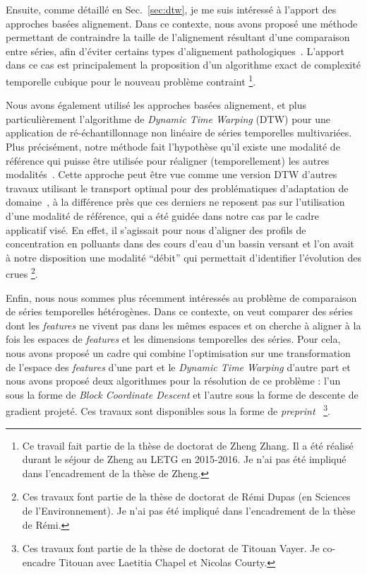 \haveabreak{}

Ensuite, comme détaillé en Sec.~\ref{sec:dtw}, je me suis intéressé à l'apport
des approches basées alignement.
Dans ce contexte, nous avons proposé une méthode
permettant de contraindre la taille de l'alignement résultant d'une comparaison
entre séries, afin d'éviter certains types d'alignement
pathologiques~\cite{zhang2017dynamic}.
L'apport dans ce cas est principalement la proposition d'un algorithme exact de
complexité temporelle cubique pour le nouveau problème contraint%
\footnote{Ce travail fait partie de la thèse de doctorat de Zheng Zhang.
Il a été réalisé
durant le séjour de Zheng au LETG en 2015-2016. Je n'ai pas été impliqué dans
l'encadrement de la thèse de Zheng.}.

Nous avons également utilisé les approches basées alignement, et plus
particulièrement l'algorithme de \emph{Dynamic Time Warping} (DTW)
pour une application de ré-échantillonnage non linéaire de séries temporelles
multivariées.
Plus précisément, notre méthode fait l'hypothèse qu'il existe une modalité de
référence qui puisse être utilisée pour réaligner (temporellement)
les autres modalités~\cite{dupas:halshs-01228397}.
Cette approche peut être vue comme une version DTW d'autres travaux utilisant
le transport optimal pour des problématiques d'adaptation de
domaine~\cite{courty:hal-02112785}, à la différence près que ces derniers ne
reposent pas sur l'utilisation d'une modalité de référence, qui a été guidée
dans notre cas par le cadre applicatif visé.
En effet, il s'agissait pour nous d'aligner des profils de concentration en
polluants dans des cours d'eau d'un bassin versant et l'on avait à notre
disposition une modalité ``débit'' qui permettait d'identifier l'évolution des
crues%
\footnote{Ces travaux font partie de la thèse de doctorat de Rémi Dupas
(en Sciences de
l'Environnement). Je n'ai pas été impliqué dans l'encadrement de la thèse de
Rémi.}.

Enfin, nous nous sommes plus récemment intéressés au problème de comparaison
de séries temporelles hétérogènes.
Dans ce contexte, on veut comparer des séries dont les \emph{features}
ne vivent pas dans les mêmes espaces et on cherche à aligner à la fois les
espaces de \emph{features} et les dimensions temporelles des séries.
Pour cela, nous avons proposé un cadre qui combine l'optimisation sur une
transformation de l'espace des \emph{features} d'une part et le
\emph{Dynamic Time Warping} d'autre part et nous avons proposé deux algorithmes
pour la résolution de ce problème : l'un sous la forme de
\emph{Block Coordinate Descent} et l'autre sous la forme de descente de
gradient projeté.
Ces travaux sont disponibles sous la forme de
\emph{preprint}~\cite{vayer2020time}%
\footnote{Ces travaux font partie de la thèse de doctorat de Titouan Vayer.
Je co-encadre Titouan avec Laetitia Chapel et Nicolas Courty.}.

